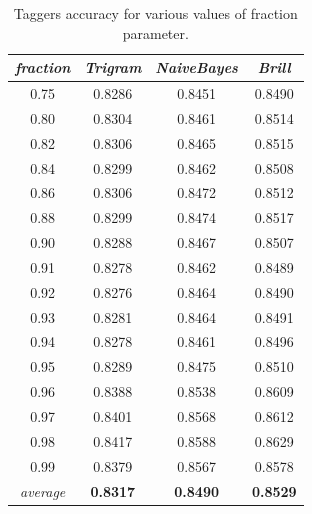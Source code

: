 \documentclass[10pt, conference, compsocconf]{IEEEtran}
\begin{document}
\begin{table}[h]
\begin{center}
\begin{tabular}{c|c|c|c}
\textit{fraction} & \textit{Trigram} & \textit{NaiveBayes} & \textit{Brill} \\\hline\hline
0.75  &  0.8286  &  0.8451  &  0.8490\\
0.80  &  0.8304  &  0.8461  &  0.8514\\
0.82  &  0.8306  &  0.8465  &  0.8515\\
0.84  &  0.8299  &  0.8462  &  0.8508\\
0.86  &  0.8306  &  0.8472  &  0.8512\\
0.88  &  0.8299  &  0.8474  &  0.8517\\
0.90  &  0.8288  &  0.8467  &  0.8507\\
0.91  &  0.8278  &  0.8462  &  0.8489\\
0.92  &  0.8276  &  0.8464  &  0.8490\\
0.93  &  0.8281  &  0.8464  &  0.8491\\
0.94  &  0.8278  &  0.8461  &  0.8496\\
0.95  &  0.8289  &  0.8475  &  0.8510\\
0.96  &  0.8388  &  0.8538  &  0.8609\\
0.97  &  0.8401  &  0.8568  &  0.8612\\
0.98  &  0.8417  &  0.8588  &  0.8629\\
0.99  &  0.8379  &  0.8567  &  0.8578\\\hline\hline
\textit{average} & \textbf{0.8317} & \textbf{0.8490} & \textbf{0.8529}
\end{tabular}
\end{center}
\caption{Taggers accuracy for various values of fraction parameter.}
\label{tab:evaluation}
\end{table}
\end{document}
